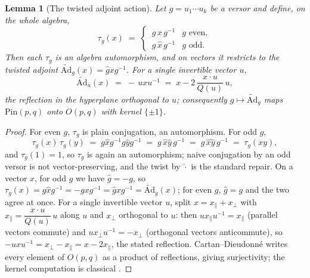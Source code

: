 \documentclass[11pt]{article}
\newtheorem{lemma}[theorem]{Lemma}
\theoremstyle{definition}
\theoremstyle{plain}
\providecommand{\Ad}{}\renewcommand{\Ad}{\widetilde{\mathrm{Ad}}}
\providecommand{\Pin}{}\renewcommand{\Pin}{\mathrm{Pin}}
\begin{document}
\begin{lemma}[The twisted adjoint action]\label{c:primer.twisted-adjoint-action}
Let $g = u_1 \cdots u_k$ be a versor and define, on the whole algebra,
\begin{equation}
\tau_g(x) \;=\;
\begin{cases}
\,g\, x\, g^{-1} & g \text{ even},\\[2pt]
\,g\, \hat{x}\, g^{-1} & g \text{ odd}.
\end{cases}
\end{equation}
Then each $\tau_g$ is an algebra automorphism, and on vectors it restricts to the twisted adjoint $\Ad_g(x) = \hat{g} x g^{-1}$. For a single invertible vector $u$,
\[
\Ad_u(x) \;=\; -\,u x u^{-1} \;=\; x - 2\,\frac{x \cdot u}{Q(u)}\,u ,
\]
the reflection in the hyperplane orthogonal to $u$; consequently $g \mapsto \Ad_g$ maps $\Pin(p,q)$ onto $O(p,q)$ with kernel $\{\pm 1\}$.
\end{lemma}
\begin{proof}
For even $g$, $\tau_g$ is plain conjugation, an automorphism. For odd $g$,
\[
\tau_g(x)\,\tau_g(y) \;=\; g\hat{x}g^{-1}g\hat{y}g^{-1} \;=\; g\,\hat{x}\hat{y}\,g^{-1} \;=\; g\,\widehat{xy}\,g^{-1} \;=\; \tau_g(xy),
\]
and $\tau_g(1) = 1$, so $\tau_g$ is again an automorphism; naive conjugation by an odd versor is not vector-preserving, and the twist by $\hat{\cdot}$ is the standard repair. On a vector $x$, for odd $g$ we have $\hat{g} = -g$, so $\tau_g(x) = g\hat{x}g^{-1} = -gxg^{-1} = \hat{g}xg^{-1} = \Ad_g(x)$; for even $g$, $\hat{g} = g$ and the two agree at once. For a single invertible vector $u$, split $x = x_{\parallel} + x_{\perp}$ with $x_{\parallel} = \dfrac{x \cdot u}{Q(u)}\,u$ along $u$ and $x_{\perp}$ orthogonal to $u$: then $u x_{\parallel} u^{-1} = x_{\parallel}$ (parallel vectors commute) and $u x_{\perp} u^{-1} = -x_{\perp}$ (orthogonal vectors anticommute), so $-uxu^{-1} = x_{\perp} - x_{\parallel} = x - 2x_{\parallel}$, the stated reflection. Cartan--Dieudonn\'e \cite{Lam2005, Porteous1995} writes every element of $O(p,q)$ as a product of reflections, giving surjectivity; the kernel computation is classical \cite{Porteous1995}.

\end{proof}
\end{document}
